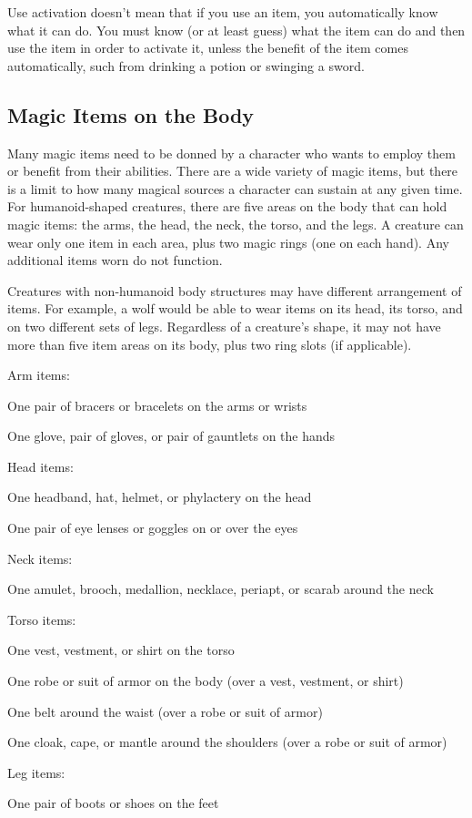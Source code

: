 Use activation doesn't mean that if you use an item, you automatically know what it can do. You must know (or at least guess) what the item can do and then use the item in order to activate it, unless the benefit of the item comes automatically, such from drinking a potion or swinging a sword.

\subsection{Magic Items on the Body}

Many magic items need to be donned by a character who wants to employ them or benefit from their abilities. There are a wide variety of magic items, but there is a limit to how many magical sources a character can sustain at any given time. For humanoid-shaped creatures, there are five areas on the body that can hold magic items: the arms, the head, the neck, the torso, and the legs. A creature can wear only one item in each area, plus two magic rings (one on each hand). Any additional items worn do not function.

Creatures with non-humanoid body structures may have different arrangement of items. For example, a wolf would be able to wear items on its head, its torso, and on two different sets of legs. Regardless of a creature's shape, it may not have more than five item areas on its body, plus two ring slots (if applicable).

Arm items:
\begin{itemize*}
\item One pair of bracers or bracelets on the arms or wrists
\item One glove, pair of gloves, or pair of gauntlets on the hands
\end{itemize*}
Head items:
\begin{itemize*}
\item One headband, hat, helmet, or phylactery on the head
\item One pair of eye lenses or goggles on or over the eyes
\end{itemize*}
Neck items:
\begin{itemize*}
\item One amulet, brooch, medallion, necklace, periapt, or scarab around the neck
\end{itemize*}
Torso items:
\begin{itemize*}
\item One vest, vestment, or shirt on the torso
\item One robe or suit of armor on the body (over a vest, vestment, or shirt)
\item One belt around the waist (over a robe or suit of armor)
\item One cloak, cape, or mantle around the shoulders (over a robe or suit of armor)
\end{itemize*}
Leg items:
\begin{itemize*}
\item One pair of boots or shoes on the feet
\end{itemize*}

